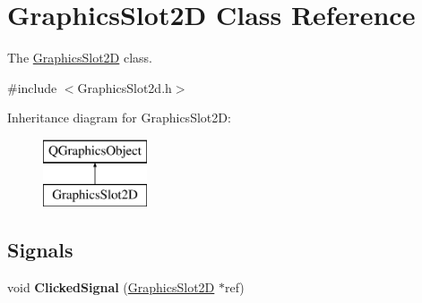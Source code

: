 \hypertarget{classGraphicsSlot2D}{\section{Graphics\-Slot2\-D Class Reference}
\label{classGraphicsSlot2D}
}


The \hyperlink{classGraphicsSlot2D}{Graphics\-Slot2\-D} class.  




{\ttfamily \#include $<$Graphics\-Slot2d.\-h$>$}

Inheritance diagram for Graphics\-Slot2\-D\-:\begin{figure}[H]
\begin{center}
\leavevmode
\includegraphics[height=2.000000cm]{classGraphicsSlot2D}
\end{center}
\end{figure}
\subsection*{Signals}
\begin{DoxyCompactItemize}
\item 
\hypertarget{classGraphicsSlot2D_a1cca679459243a836ace0c4aca3923e8}{void {\bfseries Clicked\-Signal} (\hyperlink{classGraphicsSlot2D}{Graphics\-Slot2\-D} $\ast$ref)}\label{classGraphicsSlot2D_a1cca679459243a836ace0c4aca3923e8}

\end{DoxyCompactItemize}
